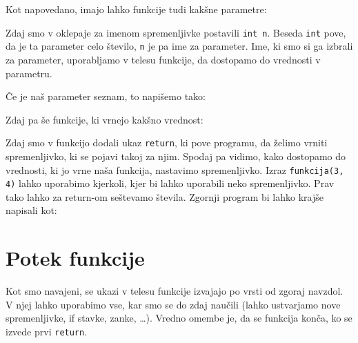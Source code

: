 Kot napovedano, imajo lahko funkcije tudi kakšne parametre:

\begin{examples}
\end{examples}

Zdaj smo v oklepaje za imenom spremenljivke postavili \verb+int n+. Beseda
\verb+int+ pove, da je ta parameter celo število, \verb+n+ je pa ime za
parameter. Ime, ki smo si ga izbrali za parameter, uporabljamo v telesu
funkcije, da dostopamo do vrednosti v parametru.

Če je naš parameter seznam, to napišemo tako:

\begin{examples}
\end{examples}

Zdaj pa še funkcije, ki vrnejo kakšno vrednost:

\begin{examples}
\end{examples}

Zdaj smo v funkcijo dodali ukaz \verb+return+, ki pove programu, da želimo
vrniti spremenljivko, ki se pojavi takoj za njim. Spodaj pa vidimo, kako
dostopamo do vrednosti, ki jo vrne naša funkcija, nastavimo spremenljivko.
Izraz \verb+funkcija(3, 4)+ lahko uporabimo kjerkoli, kjer bi lahko uporabili
neko spremenljivko. Prav tako lahko za return-om seštevamo števila. Zgornji
program bi lahko krajše napisali kot:

\begin{examples}
\end{examples}


\section{Potek funkcije}

Kot smo navajeni, se ukazi v telesu funkcije izvajajo po vrsti od zgoraj
navzdol. V njej lahko uporabimo vse, kar smo se do zdaj naučili (lahko
ustvarjamo nove spremenljivke, if stavke, zanke, \ldots ). Vredno omembe je, da
se funkcija konča, ko se izvede prvi \verb+return+.

\begin{examples}
\end{examples}

